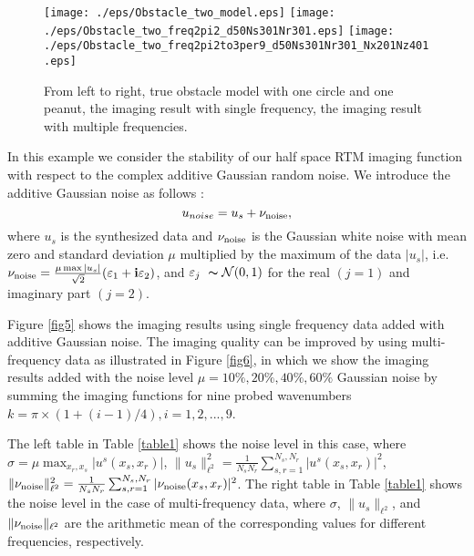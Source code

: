 \documentclass[11pt]{iopart}
\begin{document}
\begin{figure}
    \centering
    \texttt{[image: ./eps/Obstacle\_two\_model.eps]}
    \texttt{[image: ./eps/Obstacle\_two\_freq2pi2\_d50Ns301Nr301.eps]}
    \texttt{[image: ./eps/Obstacle\_two\_freq2pi2to3per9\_d50Ns301Nr301\_Nx201Nz401.eps]}
    \caption{From left to right, true obstacle model with one circle and one peanut, the imaging result with single frequency, the imaging result with multiple frequencies.}\label{fig3}
\end{figure}


\begin{exmp}
{\rm In this example we consider the stability of our half space RTM imaging function with respect to the complex additive Gaussian random noise. We introduce the additive Gaussian noise as follows \cite{cch_a}:
    \begin{equation*}
        u_{noise} = u_s + \nu_{\rm noise},
    \end{equation*}
where $u_s$ is the synthesized data and $\nu_{\rm noise}$ is the Gaussian white noise with mean zero and standard deviation $\mu$ multiplied by the maximum of  the data $|u_s|$, i.e. $\nu_{\rm noise}=\frac{\mu \max|u_s|}{\sqrt{2}}({\varepsilon}_1 + \mathbf{i} {\varepsilon}_2)$, and ${\varepsilon}_j ~ \thicksim \mathcal{N}(0,1)$ for the real $(j=1)$ and imaginary part $(j=2)$.

Figure \ref{fig5} shows the imaging results using single frequency data added with additive Gaussian noise.  The imaging quality can be improved by using multi-frequency data as illustrated in Figure \ref{fig6}, in which we show the imaging results added with  the noise level $\mu =10\%, 20\%, 40\%, 60\%$ Gaussian noise by summing the imaging functions for nine probed wavenumbers $k=\pi\times(1+(i-1)/4),i=1,2,...,9$.

The left table in Table \ref{table1} shows the noise level in this case, where $\sigma=\mu \max_{x_r,x_s}|u^s(x_s,x_r)|$, $\|u_s\|_{\ell^2}^2=\frac{1}{N_sN_r}\sum^{N_s,N_r}_{s,r=1}|u^s(x_s,x_r)|^2$, $\|\nu_{\rm noise}\|_{\ell^2}^2 = \frac{1}{N_sN_r}\sum^{N_s,N_r}_{s,r=1}|\nu_{\rm noise}(x_s,x_r)|^2$.
The right table in Table \ref{table1} shows the noise level in the case of multi-frequency data, where $\sigma$, $\|u_s\|_{\ell^2}$, and $\|\nu_{\rm noise}\|_{\ell^2}$ are the arithmetic mean of the corresponding values for different frequencies, respectively. }
\end{exmp}
\end{document}
